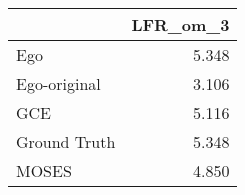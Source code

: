 \begin{tabular}{lr}
\toprule
{} & LFR_om_3 \\
\midrule
Ego          &    5.348 \\
Ego-original &    3.106 \\
GCE          &    5.116 \\
Ground Truth &    5.348 \\
MOSES        &    4.850 \\
\bottomrule
\end{tabular}
